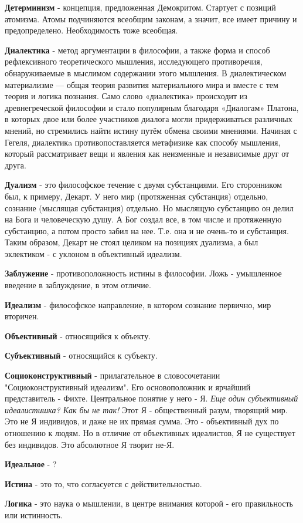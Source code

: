 \documentclass[12pt,a4paper]{article}
\begin{document}
\textbf{Детерминизм} - концепция, предложенная Демокритом. Стартует с позиций атомизма. Атомы подчиняются всеобщим законам, а значит, все имеет причину и предопределено. Необходимость тоже всеобщая.

\textbf{Диалектика} - метод аргументации в философии, а также форма и способ рефлексивного теоретического мышления, исследующего противоречия, обнаруживаемые в мыслимом содержании этого мышления. В диалектическом материализме — общая теория развития материального мира и вместе с тем теория и логика познания. Само слово «диалектика» происходит из древнегреческой философии и стало популярным благодаря «Диалогам» Платона, в которых двое или более участников диалога могли придерживаться различных мнений, но стремились найти истину путём обмена своими мнениями. Начиная с Гегеля, диалектикa противопоставляется метафизике как способу мышления, который рассматривает вещи и явления как неизменные и независимые друг от друга.

\textbf{Дуализм} - это философское течение с двумя субстанциями. Его сторонником был, к примеру, Декарт. У него мир (протяженная субстанция) отдельно, сознание (мыслящая субстанция) отдельно. Но мыслящую субстанцию он делил на Бога и человеческую душу. А Бог создал все, в том числе и протяженную субстанцию, а потом просто забил на нее. Т.е. она и не очень-то и субстанция. Таким образом, Декарт не стоял целиком на позициях дуализма, а был эклектиком - с уклоном в объективный идеализм. 

\textbf{Заблужение} - противоположность истины в философии. Ложь - умышленное введение в заблуждение, в этом отличие.

\textbf{Идеализм} - философское направление, в котором сознание первично, мир вторичен.

\textbf{Объективный} - относящийся к объекту.

\textbf{Субъективный} - относящийся к субъекту.

\textbf{Социоконструктивный} - прилагательное в словосочетании "Социоконструктивный идеализм". Его основоположник и ярчайший представитель - Фихте. Центральное понятие у него - Я. \textit{Еще один субъективный идеалистишка? Как бы не так!} Этот Я - общественный разум, творящий мир. Это не Я индивидов, и даже не их прямая сумма. Это - объективный дух по отношению к людям. Но в отличие от объективных идеалистов, Я не существует без индивидов. Это абсолютное Я творит не-Я.

\textbf{Идеальное} - ?

\textbf{Истина} - это то, что согласуется с действительностью.

\textbf{Логика} - это наука о мышлении, в центре внимания которой - его правильность или истинность.
\end{document}
